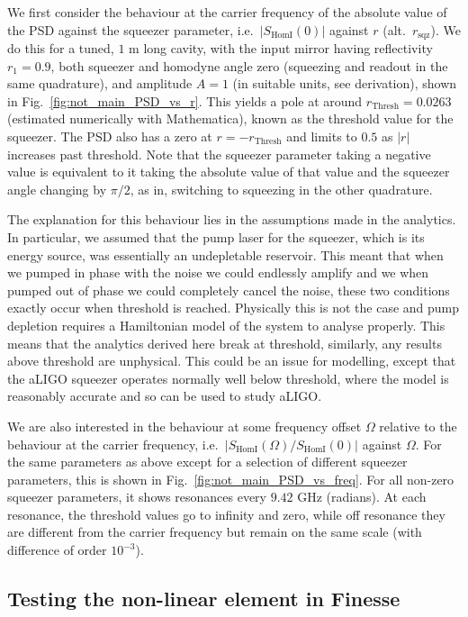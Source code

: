 \documentclass[aps,pra,superscriptaddress,reprint,nofootinbib]{revtex4-1}
\newcommand{\abs}[1]{\left\lvert #1 \right\rvert}
\begin{document}
We first consider the behaviour at the carrier frequency of the absolute value of the PSD against the squeezer parameter, i.e.\ $\abs{S_{\mathrm{HomI}}(0)}$ against $r$ (alt.\ $r_\mathrm{sqz}$). We do this for a tuned, $1$ m long cavity, with the input mirror having reflectivity $r_1 = 0.9$, both squeezer and homodyne angle zero (squeezing and readout in the same quadrature), and amplitude $A = 1$ (in suitable units, see derivation), shown in Fig.~\ref{fig:not_main_PSD_vs_r}. This yields a pole at around $r_\mathrm{Thresh} = 0.0263$ (estimated numerically with Mathematica), known as the threshold value for the squeezer. The PSD also has a zero at $r = -r_\mathrm{Thresh}$ and limits to $0.5$ as $\abs{r}$ increases past threshold. Note that the squeezer parameter taking a negative value is equivalent to it taking the absolute value of that value and the squeezer angle changing by $\pi/2$, as in, switching to squeezing in the other quadrature.


The explanation for this behaviour lies in the assumptions made in the analytics. In particular, we assumed that the pump laser for the squeezer, which is its energy source, was essentially an undepletable reservoir. This meant that when we pumped in phase with the noise we could endlessly amplify and we when pumped out of phase we could completely cancel the noise, these two conditions exactly occur when threshold is reached. Physically this is not the case and pump depletion requires a Hamiltonian model of the system to analyse properly. This means that the analytics derived here break at threshold, similarly, any results above threshold are unphysical.
This could be an issue for modelling, except that the aLIGO squeezer operates normally well below threshold, where the model is reasonably accurate and so can be used to study aLIGO.


We are also interested in the behaviour at some frequency offset $\Omega$ relative to the behaviour at the carrier frequency, i.e.\ $\abs{S_{\mathrm{HomI}}(\Omega)/S_{\mathrm{HomI}}(0)}$ against $\Omega$. For the same parameters as above except for a selection of different squeezer parameters, this is shown in Fig.~\ref{fig:not_main_PSD_vs_freq}. For all non-zero squeezer parameters, it shows resonances every $9.42$ GHz (radians). At each resonance, the threshold values go to infinity and zero, while off resonance they are different from the carrier frequency but remain on the same scale (with difference of order $10^{-3}$).


\subsection{Testing the non-linear element in Finesse}
\end{document}
